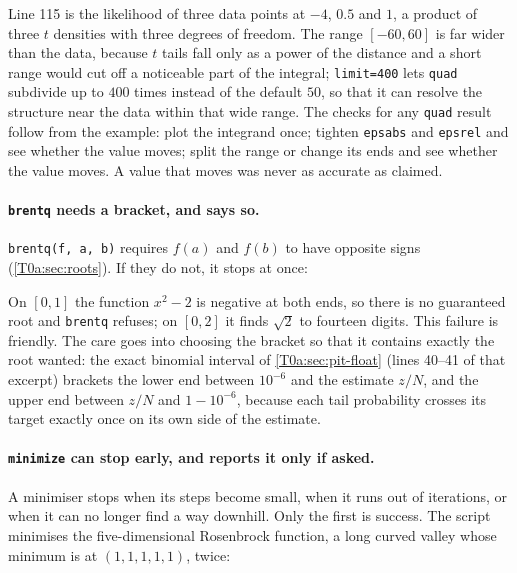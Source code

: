 
Line 115 is the likelihood of three data points at $-4$, $0.5$ and $1$, a product of three $t$ densities with three degrees of freedom. The range $[-60,60]$ is far wider than the data, because $t$ tails fall only as a power of the distance and a short range would cut off a noticeable part of the integral; \texttt{limit=400} lets \texttt{quad} subdivide up to $400$ times instead of the default $50$, so that it can resolve the structure near the data within that wide range. The checks for any \texttt{quad} result follow from the example: plot the integrand once; tighten \texttt{epsabs} and \texttt{epsrel} and see whether the value moves; split the range or change its ends and see whether the value moves. A value that moves was never as accurate as claimed.

\paragraph{\texttt{brentq} needs a bracket, and says so.} \texttt{brentq(f, a, b)} requires $f(a)$ and $f(b)$ to have opposite signs (\cref{T0a:sec:roots}). If they do not, it stops at once:


On $[0,1]$ the function $x^2-2$ is negative at both ends, so there is no guaranteed root and \texttt{brentq} refuses; on $[0,2]$ it finds $\sqrt2$ to fourteen digits. This failure is friendly. The care goes into choosing the bracket so that it contains exactly the root wanted: the exact binomial interval of \cref{T0a:sec:pit-float} (lines 40--41 of that excerpt) brackets the lower end between $10^{-6}$ and the estimate $z/N$, and the upper end between $z/N$ and $1-10^{-6}$, because each tail probability crosses its target exactly once on its own side of the estimate.

\paragraph{\texttt{minimize} can stop early, and reports it only if asked.} A minimiser stops when its steps become small, when it runs out of iterations, or when it can no longer find a way downhill. Only the first is success. The script minimises the five-dimensional Rosenbrock function, a long curved valley whose minimum is at $(1,1,1,1,1)$, twice:

